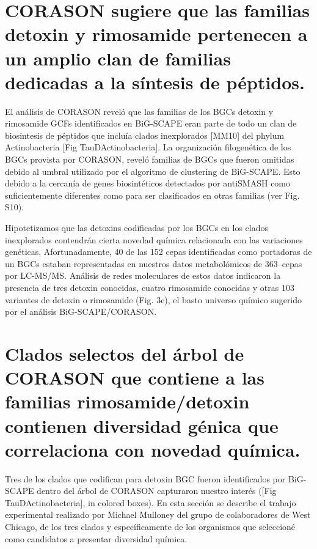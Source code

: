 \documentclass[12pt,twoside]{reedthesis}
\begin{document}
  \section{CORASON sugiere que las familias detoxin y rimosamide
  pertenecen a un amplio clan de familias dedicadas a la síntesis de
  péptidos.}\label{corason-sugiere-que-las-familias-detoxin-y-rimosamide-pertenecen-a-un-amplio-clan-de-familias-dedicadas-a-la-sintesis-de-peptidos.}
  
  El análisis de CORASON reveló que las familias de los BGCs detoxin y
  rimosamide GCFs identificados en BiG-SCAPE eran parte de todo un clan de
  biosintesis de péptidos que incluía clados inexplorados {[}MM10{]} del
  phylum Actinobacteria {[}Fig TauDActinobacteria{]}. La organización
  filogenética de los BGCs provista por CORASON, reveló familias de BGCs
  que fueron omitidas debido al umbral utilizado por el algoritmo de
  clustering de BiG-SCAPE. Esto debido a la cercanía de genes
  biosintéticos detectados por antiSMASH como suficientemente diferentes
  como para ser clasificados en otras familias (ver Fig. S10).
  
  Hipotetizamos que las detoxins codificadas por los BGCs en los clados
  inexplorados contendrán cierta novedad química relacionada con las
  variaciones genéticas. Afortunadamente, 40 de las 152 cepas
  identificadas como portadoras de un BGCs estaban representadas en
  nuestros datos metabolómicos de 363--cepas por LC-MS/MS. Análisis de
  redes moleculares de estos datos indicaron la presencia de tres detoxin
  conocidas, cuatro rimosamide conocidas y otras 103 variantes de detoxin
  o rimosamide (Fig. 3c), el basto universo químico sugerido por el
  análisis BiG-SCAPE/CORASON.
  
  \section{Clados selectos del árbol de CORASON que contiene a las
  familias rimosamide/detoxin contienen diversidad génica que correlaciona
  con novedad
  química.}\label{clados-selectos-del-arbol-de-corason-que-contiene-a-las-familias-rimosamidedetoxin-contienen-diversidad-genica-que-correlaciona-con-novedad-quimica.}
  
  Tres de los clados que codifican para detoxin BGC fueron identificados
  por BiG-SCAPE dentro del árbol de CORASON capturaron nuestro interés
  ({[}Fig TauDActinobacteria{]}, in colored boxes). En esta sección se
  describe el trabajo experimental realizado por Michael Mulloney del
  grupo de colaboradores de West Chicago, de los tres clados y
  específicamente de los organismos que seleccioné como candidatos a
  presentar diversidad química.
  
\end{document}
